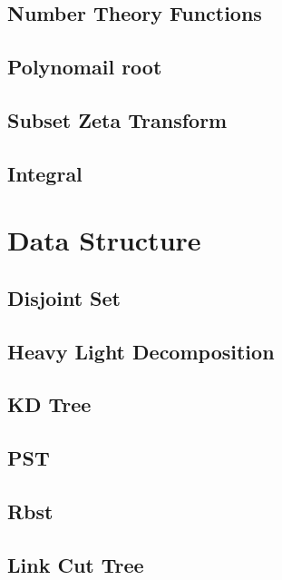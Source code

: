 \subsection{Number Theory Functions}

\subsection{Polynomail root}

\subsection{Subset Zeta Transform}

\subsection{Integral}



\section{Data Structure}
\subsection{Disjoint Set}

\subsection{Heavy Light Decomposition}

\subsection{KD Tree}

%
\subsection{PST}

\subsection{Rbst}

\subsection{Link Cut Tree}

